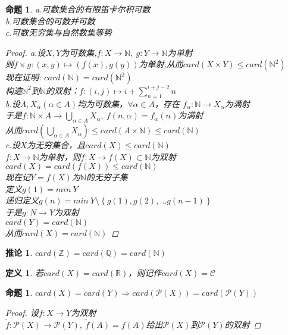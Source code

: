 \documentclass[12pt, a4paper, oneside]{ctexbook}
\newtheorem{definition}[theorem]{定义}
\newtheorem{corollary}[theorem]{推论}
\newtheorem{proposition}[theorem]{命题}
\begin{document}
\begin{proposition}
    a.可数集合的有限笛卡尔积可数\\
    b.可数集合的可数并可数\\
    c.可数无穷集与自然数集等势
    \begin{proof}
        a.设$X,Y$为可数集,$f:X\rightarrow \mathbb{N},\ g:Y\rightarrow\mathbb{N}$为单射\\
        则$f\times g:(x,y)\mapsto (f(x),g(y))$为单射,从而$card(X\times Y)\leq card(\mathbb{N}^2)$\\
        现在证明: $card(\mathbb{N})=card(\mathbb{N^2})$\\
        构造$\mathbb{N}^2$到$\mathbb{N}$的双射：$f:(i,j)\mapsto i+\sum_{n=1}^{i+j-2}n$\\[0.5cm]
        b.设$A,X_{\alpha}(\alpha\in A)$均为可数集，$\forall \alpha\in A$，存在 $f_{\alpha}:\mathbb{N}\rightarrow X_{\alpha}$为满射\\
        于是$f:\mathbb{N}\times A\rightarrow \bigcup_{\alpha\in A}X_{\alpha},\ f(n,\alpha)=f_{\alpha}(n)$为满射\\
        从而$card(\bigcup_{\alpha\in A}X_{\alpha})\leq card(A\times \mathbb{N})\leq card(\mathbb{N})$\\[0.5cm]
        c.设$X$为无穷集合，且$card(X)\leq card(\mathbb{N})$\\
        $f:X\rightarrow \mathbb{N}$为单射，则$f:X\rightarrow f(X)\subset \mathbb{N}$为双射\\
        $card(X)=card(f(X))\leq card(\mathbb{N})$\\
        现在记$Y=f(X)$为$\mathbb{N}$的无穷子集\\
        定义$g(1)=min\ Y$\\
        递归定义$g(n)=min\ Y\setminus\left\{g(1),g(2),\dots g(n-1)\right\}$\\
        于是$g:N\rightarrow Y$为双射\\
        $card(Y)=card(\mathbb{N})$\\
        从而$card(X)=card(\mathbb{N})$
    \end{proof}
\end{proposition}
\begin{corollary}
    $card(\mathbb{Z})=card(\mathbb{Q})=card(\mathbb{N})$
\end{corollary}
\begin{definition}
    若$card(X)=card(\mathbb{R})$，则记作$card(X)=\mathcal{C}$
\end{definition}
\begin{proposition}
    $card(X)=card(Y)\Rightarrow card(\mathcal{P}(X))=card(\mathcal{P}(Y))$
    \begin{proof}
        设$f:X\rightarrow Y$为双射\\
        $\tilde{f}:\mathcal{P}(X)\rightarrow\mathcal{P}(Y),\ \tilde{f}(A)=f(A)$给出$\mathcal{P}(X)$到$\mathcal{P}(Y)$的双射
    \end{proof}
\end{proposition}
\end{document}

